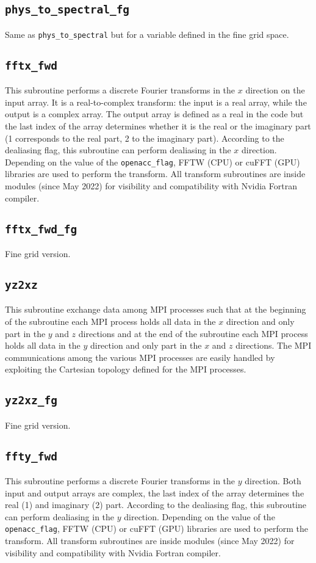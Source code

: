 \subsection{\texttt{phys\_to\_spectral\_fg}}
Same as \texttt{phys\_to\_spectral} but for a variable defined in the fine grid space.

\subsection{\texttt{fftx\_fwd}}
\label{sec: fftx}
This subroutine performs a discrete Fourier transforms in the $x$ direction on the input array. It is a real-to-complex transform: the input is a real array, while the output is a complex array. 
The output array is defined as a real in the code but the last index of the array determines whether it is the real or the imaginary part (1 corresponds to the real part, 2 to the imaginary part). 
According to the dealiasing flag, this subroutine can perform dealiasing in the $x$ direction.
Depending on the value of the \texttt{openacc\_flag}, FFTW (CPU) or cuFFT (GPU) libraries are used to perform the transform.
All transform subroutines are inside modules (since May 2022) for visibility and compatibility with Nvidia Fortran compiler.

\subsection{\texttt{fftx\_fwd\_fg}}
\label{sec: fftx}
Fine grid version.

\subsection{\texttt{yz2xz}}
This subroutine exchange data among MPI processes such that at the beginning of the subroutine each MPI process holds all data in the $x$ direction and only part in the $y$ and $z$ directions and at the end of the subroutine each MPI process holds all data in the $y$ direction and only part in the $x$ and $z$ directions. The MPI communications among the various MPI processes are easily handled by exploiting the Cartesian topology defined for the MPI processes.

\subsection{\texttt{yz2xz\_fg}}
Fine grid version.

\subsection{\texttt{ffty\_fwd}}
This subroutine performs a discrete Fourier transforms in the $y$ direction. Both input and output arrays are complex, the last index of the array determines the real (1) and imaginary (2) part. According to the dealiasing flag, this subroutine can perform dealiasing in the $y$ direction.
Depending on the value of the \texttt{openacc\_flag}, FFTW (CPU) or cuFFT (GPU) libraries are used to perform the transform.
All transform subroutines are inside modules (since May 2022) for visibility and compatibility with Nvidia Fortran compiler.


